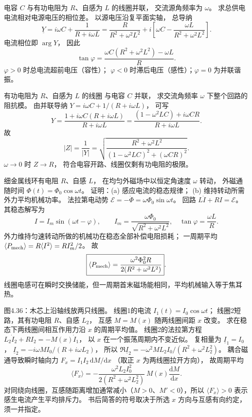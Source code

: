 电容 $C$ 与有功电阻为 $R$、自感为 $L$ 的线圈并联，
交流源角频率为 $\omega$。
求总供电电流相对电源电压的相位差。
\exsolution
以源电压沿复平面实轴，
总导纳
\[
\underline Y=i\omega C+\frac1{R+i\omega L}
=\frac R{R^2+\omega^2L^2}
+i\left[\omega C-\frac{\omega L}{R^2+\omega^2L^2}\right].
\]
电流相位即 $\arg Y$，
因此
\[
\boxed{\tan\varphi=
\frac{\omega C(R^2+\omega^2L^2)-\omega L}{R}}.
\]
\excheck $\varphi>0$ 时总电流超前电压（容性）；
$\varphi<0$ 时滞后电压（感性）；$\varphi=0$ 为并联谐振。

有功电阻为 $R$、自感为 $L$ 的线圈
与电容 $C$ 并联，
求交流角频率 $\omega$ 下整个回路的阻抗模。
\exsolution
由并联导纳
$Y=i\omega C+1/(R+i\omega L)$，
可写
\[
Y=\frac{1+i\omega C(R+i\omega L)}
{R+i\omega L}
=\frac{(1-\omega^2LC)+i\omega CR}
{R+i\omega L}.
\]
故
\[
\boxed{|Z|=\frac1{|Y|}
=\sqrt{\frac{R^2+\omega^2L^2}
{(1-\omega^2LC)^2+(\omega CR)^2}}}.
\]
\excheck $\omega\to0$ 时 $Z\to R$，
符合电容开路、线圈仅剩有功电阻的极限。

细金属线环有电阻 $R$、自感 $L$，
在均匀外磁场中以恒定角速度 $\omega$ 转动，
外磁通随时间
$\Phi(t)=\Phi_0\cos\omega t$。
证明：(a) 感应电流的稳态规律；
(b) 维持转动所需外力平均机械功率。
\exsolution
法拉第电动势
$\mathcal E=-\dot\Phi=\omega\Phi_0\sin\omega t$。
回路
$L\dot I+RI=\mathcal E$。
其稳态解写为
\[
\boxed{I=I_m\sin(\omega t-\varphi)},\qquad
\boxed{I_m=\frac{\omega\Phi_0}
{\sqrt{R^2+\omega^2L^2}}},
\quad
\boxed{\tan\varphi=\frac{\omega L}{R}}.
\]
外力维持匀速转动所做的机械功在稳态全部补偿电阻损耗；
一周期平均
$\langle P_{\rm mech}\rangle
=R\langle I^2\rangle=RI_m^2/2$。
故
\[
\boxed{\langle P_{\rm mech}\rangle
=\frac{\omega^2\Phi_0^2R}{2(R^2+\omega^2L^2)}}.
\]
\excheck 线圈电感可在瞬时交换储能，但一周期首末磁场能相同，平均机械输入等于焦耳热。

图4.36：木芯上沿轴线放两只线圈。
线圈1的电流
$I_1(t)=I_0\cos\omega t$；
线圈2短路，其有功电阻 $R$、自感 $L_2$，
互感 $M=M(x)$ 随两线圈间距 $x$ 改变。
求在稳态下两线圈间相互作用力沿 $x$ 的周期平均值。
\exsolution
线圈2的法拉第方程
$L_2\dot I_2+RI_2=-M(x)\dot I_1$，
以 $x$ 在一个振荡周期内不变近似。
复相量为
$\underline I_1=I_0$，
$\underline I_2=
-i\omega M I_0/(R+i\omega L_2)$，
所以
$\Re\underline I_2=
-\omega^2M L_2 I_0/(R^2+\omega^2L_2^2)$。
耦合磁通导致瞬时轴向力
$F_x=I_1I_2\,\mathrm dM/\mathrm dx$
（取正 $x$ 为两线圈拉开方向），
故周期平均
\[
\boxed{\langle F_x\rangle=
-\frac{\omega^2L_2I_0^2}{2(R^2+\omega^2L_2^2)}
\,M(x)\frac{\mathrm dM}{\mathrm dx}}.
\]
\excheck 对同绕向线圈，互感随距离增加通常减小（$M>0$、$M'<0$），所以
$\langle F_x\rangle>0$ 表示感生电流产生平均排斥力。
书后简答的符号取决于所选 $x$ 方向与互感有向约定，须一并指定。
